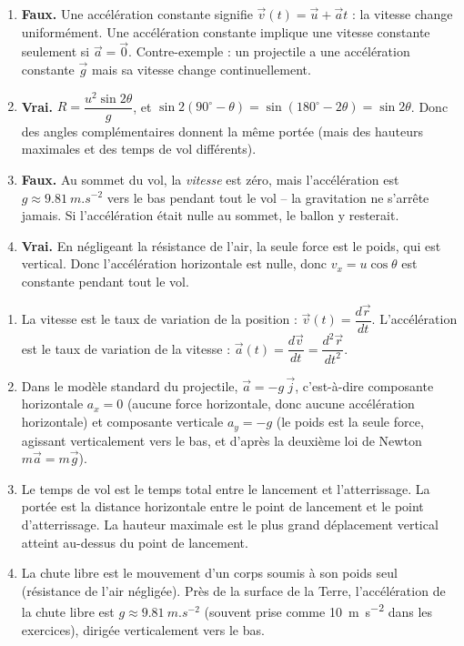 \documentclass[11pt]{article}
\newcommand{\cle}[1]{{\popxbold\color{popdark}#1}}
\begin{document}
\begin{corrige}
\begin{enumerate}
\item \textbf{Faux.} Une acc\'el\'eration constante signifie $\vec{v}(t) = \vec{u} + \vec{a}t$ : la vitesse change uniform\'ement. Une acc\'el\'eration constante implique une vitesse constante seulement si $\vec{a} = \vec{0}$. Contre-exemple : un projectile a une acc\'el\'eration constante $\vec{g}$ mais sa vitesse change continuellement.
\item \textbf{Vrai.} $R = \dfrac{u^2\sin 2\theta}{g}$, et $\sin 2(90^\circ - \theta) = \sin(180^\circ - 2\theta) = \sin 2\theta$. Donc des angles compl\'ementaires donnent la m\^eme port\'ee (mais des hauteurs maximales et des temps de vol diff\'erents).
\item \textbf{Faux.} Au sommet du vol, la \emph{vitesse} est z\'ero, mais l'acc\'el\'eration est $g \approx \SI{9.81}{m.s^{-2}}$ vers le bas pendant tout le vol -- la gravitation ne s'arr\^ete jamais. Si l'acc\'el\'eration \'etait nulle au sommet, le ballon y resterait.
\item \textbf{Vrai.} En n\'egligeant la r\'esistance de l'air, la seule force est le poids, qui est vertical. Donc l'acc\'el\'eration horizontale est nulle, donc $v_x = u\cos\theta$ est constante pendant tout le vol.
\end{enumerate}
\end{corrige}

\begin{corrige}
\begin{enumerate}
\item La \cle{vitesse} est le taux de variation de la position : $\vec{v}(t) = \dfrac{d\vec{r}}{dt}$. L'\cle{acc\'el\'eration} est le taux de variation de la vitesse : $\vec{a}(t) = \dfrac{d\vec{v}}{dt} = \dfrac{d^2\vec{r}}{dt^2}$.
\item Dans le mod\`ele standard du projectile, $\vec{a} = -g\,\vec{j}$, c'est-\`a-dire composante horizontale $a_x = 0$ (aucune force horizontale, donc aucune acc\'el\'eration horizontale) et composante verticale $a_y = -g$ (le poids est la seule force, agissant verticalement vers le bas, et d'apr\`es la deuxi\`eme loi de Newton $m\vec{a} = m\vec{g}$).
\item Le \cle{temps de vol} est le temps total entre le lancement et l'atterrissage. La \cle{port\'ee} est la distance horizontale entre le point de lancement et le point d'atterrissage. La \cle{hauteur maximale} est le plus grand d\'eplacement vertical atteint au-dessus du point de lancement.
\item La \cle{chute libre} est le mouvement d'un corps soumis \`a son poids seul (r\'esistance de l'air n\'eglig\'ee). Pr\`es de la surface de la Terre, l'acc\'el\'eration de la chute libre est $g \approx \SI{9.81}{m.s^{-2}}$ (souvent prise comme \SI{10}{m.s^{-2}} dans les exercices), dirig\'ee verticalement vers le bas.
\end{enumerate}
\end{corrige}
\end{document}
